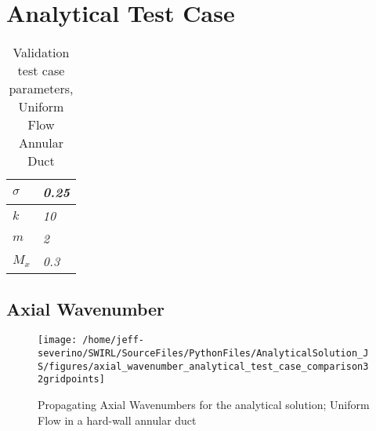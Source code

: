 \documentclass[a4paper]{report}
\begin{document}


 
 
\section{Analytical Test Case}
\begin{table}[h!]
    \centering
    \begin{tabular}{|l|l|}
        \hline
        $\sigma$ & \textit{0.25} \\ \hline
        $k$      & \textit{10}   \\ \hline
        $m$      & \textit{2}    \\ \hline
        $M_x$    & \textit{0.3}  \\ \hline
    \end{tabular}
    \caption{Validation test case parameters, Uniform Flow Annular Duct} 
\end{table}

\subsection{Axial Wavenumber}
\begin{figure}
    \centering
    \texttt{[image: /home/jeff-severino/SWIRL/SourceFiles/PythonFiles/AnalyticalSolution\_JS/figures/axial\_wavenumber\_analytical\_test\_case\_comparison32gridpoints]}
    \caption{Propagating Axial Wavenumbers for the analytical solution; Uniform
    Flow in a hard-wall annular duct}
    \label{fig:analytical_bessel_function}
\end{figure}
\end{document}
